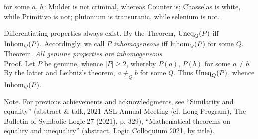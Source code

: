 \documentclass[bsl,meeting]{asl}
\begin{document}
for some 
$ a $, 
$ b $\,: 
Mulder is not criminal, whereas Counter is;
Chasselas is white, while Primitivo is not; 
plutonium is transuranic, while selenium is not.  
\par
Differentiating properties always exist. 
By the Theorem, 
$ {\rm Uneq} _Q ( P ) $
iff 
$ {\rm Inhom} _Q ( P ) $.
Accordingly, 
we call 
$ P $
{\it inhomogeneous} 
iff 
$ {\rm Inhom} _Q ( P ) $
for some 
$ Q $. 
\\
{\sc Theorem}. 
{\it 
All genuine properties are inhomogeneous}.
\\
Proof. 
Let 
$ P $ 
be genuine,
whence 
$ | P | \geq 2 $, 
whereby 
$ P ( a ) $, 
$ P ( b ) $
for some
$ a \neq b $.
By the latter
and  
Leibniz's theorem, 
$ a \not\equiv _Q b $
for some 
$ Q $. 
Thus
$ {\rm Uneq} _Q (P) $, 
whence 
$ {\rm Inhom} _Q ( P ) $. 
\par 
Note. 
For previous achievements and acknowledgments, 
see 
``Similarity and equality'' 
(abstract \& talk, 
2021 ASL Annual Meeting (cf. Long Program), 
The Bulletin of Symbolic Logic 27 (2021), p. 329),
``Mathematical theorems on equality and unequality''
(abstract, 
Logic Colloquium 2021, by title). 
\end{document}
